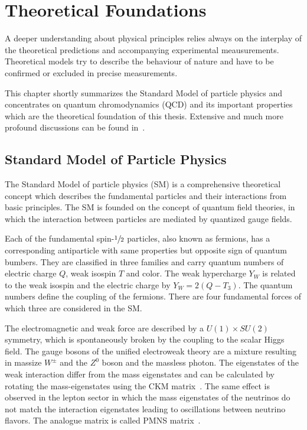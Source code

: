 
\chapter{Theoretical Foundations}
\label{sec:theoretical_foundations}

A deeper understanding about physical principles relies always on the interplay
of the theoretical predictions and accompanying experimental meausurements.
Theoretical models try to describe the behaviour of nature and have to be
confirmed or excluded in precise measurements.

This chapter shortly summarizes the Standard Model of particle physics and
concentrates on quantum chromodynamics (QCD) and its important properties which
are the theoretical foundation of this thesis. Extensive and much more profound
discussions can be found in~\cite{all_theory_used}.

\section{Standard Model of Particle Physics}

The Standard Model of particle physics (SM) is a comprehensive theoretical
concept which describes the fundamental particles and their interactions from
basic principles. The SM is founded on the concept of quantum field theories, in
which the interaction between particles are mediated by quantized gauge fields.

Each of the fundamental spin-$\sfrac{1}{2}$ particles, also known as fermions,
has a corresponding antiparticle with same properties but opposite sign of
quantum bumbers. They are classified in three families and carry quantum numbers
of electric charge $Q$, weak isospin $T$ and color. The weak hypercharge $Y_W$
is related to the weak isospin and the electric charge by $Y_W = 2(Q-T_3)$. The
quantum numbers define the coupling of the fermions. There are four fundamental
forces of which three are considered in the SM.

The electromagnetic and weak force are described by a $U(1)\times SU(2)$
symmetry, which is spontaneously broken by the coupling to the scalar Higgs
field. The gauge bosons of the unified electroweak theory are a mixture
resulting in massize $W^\pm$ and the $Z^0$ boson and the massless photon. The
eigenstates of the weak interaction differ from the mass eigenstates and can be
calculated by rotating the mass-eigenstates using the CKM
matrix~\cite{Cabibbo:1963yz,Kobayashi:1973fv}. The
same effect is observed in the lepton sector in which the mass eigenstates of
the neutrinos do not match the interaction eigenstates leading to oscillations
between neutrino flavors. The analogue matrix is called PMNS
matrix~\cite{Maki:1962mu,Pontecorvo:1957qd}.

